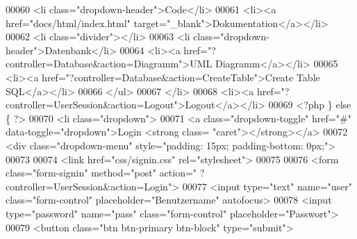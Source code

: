 \begin{DoxyCode}
00060                                         <li \textcolor{keyword}{class}=\textcolor{stringliteral}{"dropdown-header"}>Code</li>
00061                         <li><a href=\textcolor{stringliteral}{"docs/html/index.html"} target=\textcolor{stringliteral}{"\_blank"}>Dokumentation</a></li>
00062                         <li \textcolor{keyword}{class}=\textcolor{stringliteral}{"divider"}></li>
00063                         <li \textcolor{keyword}{class}=\textcolor{stringliteral}{"dropdown-header"}>Datenbank</li>
00064                         <li><a href=\textcolor{stringliteral}{"?controller=Database&action=Diagramm"}>UML Diagramm</a></li>
00065                         <li><a href=\textcolor{stringliteral}{"?controller=Database&action=CreateTable"}>Create Table SQL</a></li>
00066               </ul>
00067             </li>
00068                                 <li><a href=\textcolor{stringliteral}{"?controller=UserSession&action=Logout"}>Logout</a></li>
00069             <?php \} \textcolor{keywordflow}{else} \{ ?>
00070                           <li \textcolor{keyword}{class}=\textcolor{stringliteral}{"dropdown"}>
00071                             <a \textcolor{keyword}{class}=\textcolor{stringliteral}{"dropdown-toggle"} href=\textcolor{stringliteral}{"#"} data-toggle=\textcolor{stringliteral}{"dropdown"}>Login <strong \textcolor{keyword}{class}=\textcolor{stringliteral}{
      "caret"}></strong></a>
00072                             <div \textcolor{keyword}{class}=\textcolor{stringliteral}{"dropdown-menu"} style=\textcolor{stringliteral}{"padding: 15px; padding-bottom: 0px;"}>
00073                                 
00074                                 <link href=\textcolor{stringliteral}{"css/signin.css"} rel=\textcolor{stringliteral}{"stylesheet"}>
00075         
00076                                                 <form \textcolor{keyword}{class}=\textcolor{stringliteral}{"form-signin"} method=\textcolor{stringliteral}{"post"} action=\textcolor{stringliteral}{"
      ?controller=UserSession&action=Login"}>
00077                                                 <input type=\textcolor{stringliteral}{"text"} name=\textcolor{stringliteral}{"user"} \textcolor{keyword}{class}=\textcolor{stringliteral}{"form-control"} 
      placeholder=\textcolor{stringliteral}{"Benutzername"} autofocus>
00078                                                 <input type=\textcolor{stringliteral}{"password"} name=\textcolor{stringliteral}{"pass"} \textcolor{keyword}{class}=\textcolor{stringliteral}{"form-control"} 
      placeholder=\textcolor{stringliteral}{"Passwort"}>
00079                                                 <button \textcolor{keyword}{class}=\textcolor{stringliteral}{"btn btn-primary btn-block"} type=\textcolor{stringliteral}{"submit"}>

\end{DoxyCode}
